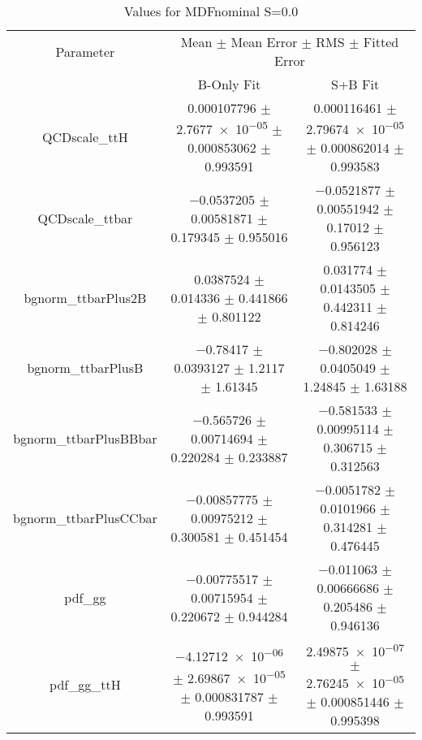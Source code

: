 \begin{table}
\centering
\caption{Values for MDFnominal S=0.0}
\begin{tabular}{ccc}
\toprule
Parameter & \multicolumn{2}{c}{Mean $\pm$ Mean Error $\pm$ RMS $\pm$ Fitted Error}\\
 & B-Only Fit & S+B Fit\\
\midrule
QCDscale\_ttH & \num{0.000107796} $\pm$ \num{2.7677e-05} $\pm$ \num{0.000853062} $\pm$ \num{0.993591} & \num{0.000116461} $\pm$ \num{2.79674e-05} $\pm$ \num{0.000862014} $\pm$ \num{0.993583}\\
QCDscale\_ttbar & \num{-0.0537205} $\pm$ \num{0.00581871} $\pm$ \num{0.179345} $\pm$ \num{0.955016} & \num{-0.0521877} $\pm$ \num{0.00551942} $\pm$ \num{0.17012} $\pm$ \num{0.956123}\\
bgnorm\_ttbarPlus2B & \num{0.0387524} $\pm$ \num{0.014336} $\pm$ \num{0.441866} $\pm$ \num{0.801122} & \num{0.031774} $\pm$ \num{0.0143505} $\pm$ \num{0.442311} $\pm$ \num{0.814246}\\
bgnorm\_ttbarPlusB & \num{-0.78417} $\pm$ \num{0.0393127} $\pm$ \num{1.2117} $\pm$ \num{1.61345} & \num{-0.802028} $\pm$ \num{0.0405049} $\pm$ \num{1.24845} $\pm$ \num{1.63188}\\
bgnorm\_ttbarPlusBBbar & \num{-0.565726} $\pm$ \num{0.00714694} $\pm$ \num{0.220284} $\pm$ \num{0.233887} & \num{-0.581533} $\pm$ \num{0.00995114} $\pm$ \num{0.306715} $\pm$ \num{0.312563}\\
bgnorm\_ttbarPlusCCbar & \num{-0.00857775} $\pm$ \num{0.00975212} $\pm$ \num{0.300581} $\pm$ \num{0.451454} & \num{-0.0051782} $\pm$ \num{0.0101966} $\pm$ \num{0.314281} $\pm$ \num{0.476445}\\
pdf\_gg & \num{-0.00775517} $\pm$ \num{0.00715954} $\pm$ \num{0.220672} $\pm$ \num{0.944284} & \num{-0.011063} $\pm$ \num{0.00666686} $\pm$ \num{0.205486} $\pm$ \num{0.946136}\\
pdf\_gg\_ttH & \num{-4.12712e-06} $\pm$ \num{2.69867e-05} $\pm$ \num{0.000831787} $\pm$ \num{0.993591} & \num{2.49875e-07} $\pm$ \num{2.76245e-05} $\pm$ \num{0.000851446} $\pm$ \num{0.995398}\\
\bottomrule
\end{tabular}
\end{table}
